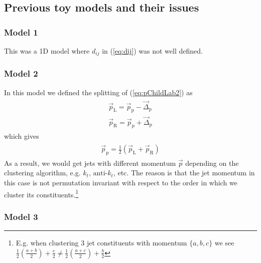 \documentclass[12pt]{article}
\newcommand{\bea}{\begin{eqnarray}\begin{aligned}}
\newcommand{\eea}{\end{aligned}\end{eqnarray}}
\begin{document}
\subsection{Previous toy models and their issues}


\subsubsection{Model 1}

This was a 1D model where $d_{ij}$ in (\ref{eq:dij}) was not well defined.

\subsubsection{Model 2}

In this model we defined the splitting of (\ref{eq:pChildLab2}) as
\bea\label{eq:pLRb}
\vec{p}_\text{L}= \vec{p}_\text{p} - \vec{\Delta}_\text{p}  \\
\vec{p}_\text{R}= \vec{p}_\text{p} +\vec{\Delta}_\text{p}
\eea
which gives
\bea
\vec{p}_\text{p}= \frac{1}{2} (\vec{p}_\text{L} + \vec{p}_\text{R} ) 
\eea
As a result, we would get jets with different momentum $\vec{p}$ depending on the clustering algorithm, e.g. $k_t$, $\text{anti-}k_t$, etc. The reason is that the jet momentum in this case is not permutation invariant with respect to the order in which we cluster its constituents.\footnote{E.g. when clustering 3 jet constituents with momentum $\{a,b,c\}$ we see $\frac{1}{2}(\frac{a+b}{2})+\frac{c}{2} \neq \frac{1}{2}(\frac{a+c}{2})+\frac{b}{2}$}

\subsubsection{Model 3}
\end{document}
